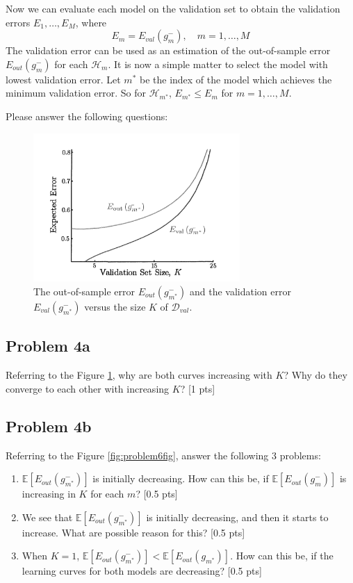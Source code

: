 \documentclass[10pt]{article}
\begin{document}
Now we can evaluate each model on the validation set to obtain the validation errors $E_1,\dots,E_M$, where
\begin{equation}
    E_m=E_{val}(g_m^-), \quad m=1,\dots,M
\end{equation}
The validation error can be used as an estimation of the out-of-sample error $E_{out}(g_m^-)$ for each $\mathcal{H}_m$.
It is now a simple matter to select the model with lowest validation error. Let $m^*$ be the index of the model which achieves the minimum validation error. So for $\mathcal{H}_{m^*}$, $E_{m^*}\leq E_{m}$ for $m=1,\dots,M$.

Please answer the following questions:
\begin{figure}[h]
    \centering
    \includegraphics[width=0.7\textwidth]{figure/ExpectedErrorVsValidationSize.png}
    \caption{The out-of-sample error $E_{out}(g_{m^*}^-)$ and the validation error $E_{val}(g_{m^*}^-)$ versus the size $K$ of $\mathcal{D}_{val}$.}
    \label{fig:problem5fig}
\end{figure}
\subsection*{Problem 4a}
Referring to the Figure \ref{fig:problem5fig}, why are both curves increasing with $K$? Why do they converge to each other with increasing $K$? {\color{red} [1 pts]}


\subsection*{Problem 4b}
Referring to the Figure \ref{fig:problem6fig}, answer the following 3 problems:
\begin{enumerate}
	\item $\mathbb{E}\left[E_{out}(g_{m^*}^-)\right]$ is initially decreasing. How can this be, if $\mathbb{E}\left[E_{out}(g_{m}^-)\right]$ is increasing in $K$ for each $m$? {\color{red} [0.5 pts]}
	\item We see that $\mathbb{E}\left[E_{out}(g_{m^*}^-)\right]$ is initially decreasing, and then it starts to increase. What are possible reason for this? {\color{red} [0.5 pts]}
	\item When $K=1$, $\mathbb{E}\left[E_{out}(g_{m^*}^-)\right]<\mathbb{E}\left[E_{out}(g_{m^*})\right]$. How can this be, if the learning curves for both models are decreasing? {\color{red} [0.5 pts]}
\end{enumerate}
\end{document}
